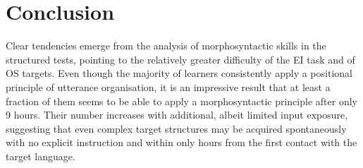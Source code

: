 \section{Conclusion}\label{sec:06:4}

Clear tendencies emerge from the analysis of morphosyntactic skills in the structured tests, pointing to the relatively greater difficulty of the EI task and of OS targets. Even though the majority of learners consistently apply a positional principle of utterance organisation, it is an impressive result that at least a fraction of them seems to be able to apply a morphosyntactic principle after only 9 hours. Their number increases with additional, albeit limited input exposure, suggesting that even complex target structures may be acquired spontaneously with no explicit instruction and within only hours from the first contact with the target language.
